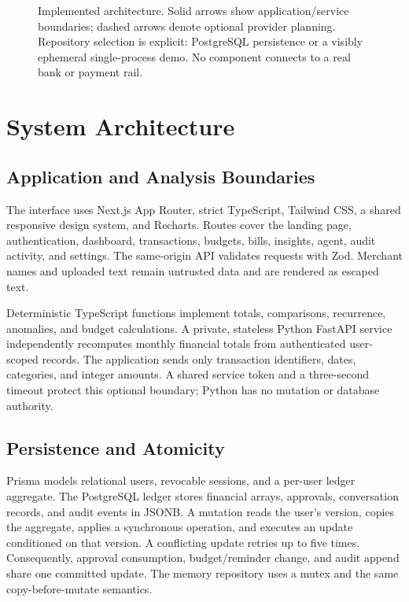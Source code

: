\documentclass[conference,a4paper]{IEEEtran}
\begin{document}
\begin{figure}[t]
\centering

\caption{Implemented architecture. Solid arrows show application/service boundaries; dashed arrows denote optional provider planning. Repository selection is explicit: PostgreSQL persistence or a visibly ephemeral single-process demo. No component connects to a real bank or payment rail.}
\label{fig:architecture}
\end{figure}

\section{System Architecture}
\subsection{Application and Analysis Boundaries}
The interface uses Next.js App Router, strict TypeScript, Tailwind CSS, a shared responsive design system, and Recharts. Routes cover the landing page, authentication, dashboard, transactions, budgets, bills, insights, agent, audit activity, and settings. The same-origin API validates requests with Zod. Merchant names and uploaded text remain untrusted data and are rendered as escaped text.

Deterministic TypeScript functions implement totals, comparisons, recurrence, anomalies, and budget calculations. A private, stateless Python FastAPI service independently recomputes monthly financial totals from authenticated user-scoped records. The application sends only transaction identifiers, dates, categories, and integer amounts. A shared service token and a three-second timeout protect this optional boundary; Python has no mutation or database authority.

\subsection{Persistence and Atomicity}
Prisma models relational users, revocable sessions, and a per-user ledger aggregate. The PostgreSQL ledger stores financial arrays, approvals, conversation records, and audit events in JSONB. A mutation reads the user's version, copies the aggregate, applies a synchronous operation, and executes an update conditioned on that version. A conflicting update retries up to five times. Consequently, approval consumption, budget/reminder change, and audit append share one committed update. The memory repository uses a mutex and the same copy-before-mutate semantics.
\end{document}
